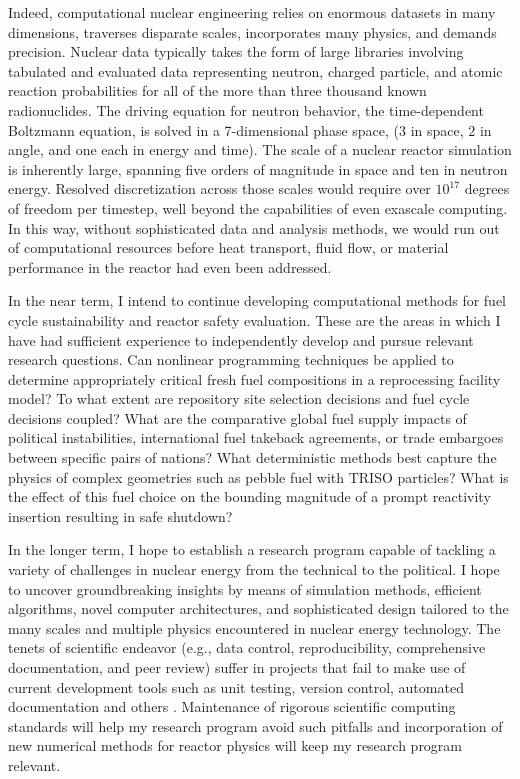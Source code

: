 \documentclass[a4paper, 12pt]{article}
\begin{document}
Indeed, computational nuclear engineering relies on enormous datasets in many 
dimensions, traverses disparate scales, incorporates many physics, and demands 
precision.  Nuclear data typically takes the form of large libraries involving 
tabulated and evaluated data representing neutron, charged particle, and atomic 
reaction probabilities for all of the more than three thousand known 
radionuclides.  The driving equation for neutron behavior, the time-dependent 
Boltzmann equation, is solved in a 7-dimensional phase space, ($3$ in space, $2$ 
in angle, and one each in energy and time). The scale of a nuclear reactor 
simulation is inherently large, spanning five orders of magnitude in space and 
ten in neutron energy. Resolved discretization across those scales would require 
over $10^{17}$ degrees of freedom per timestep, well beyond the
capabilities of even exascale computing. In this way, without sophisticated
data and analysis methods, we would run out of computational resources before
heat transport, fluid flow, or material performance in the reactor had even
been addressed.

In the near term, I intend to continue developing computational methods for fuel 
cycle sustainability and reactor safety evaluation. These are the areas in which I 
have had sufficient experience to independently develop and pursue relevant 
research questions.  Can nonlinear programming techniques be applied to 
determine appropriately critical fresh fuel compositions in a reprocessing 
facility model? To what extent are repository site selection decisions and fuel 
cycle decisions coupled? What are the comparative global fuel supply impacts of 
political instabilities, international fuel takeback agreements, or
trade embargoes between specific pairs of nations?  What deterministic methods 
best capture the physics of complex geometries such as pebble fuel with TRISO 
particles? What is the effect of this fuel choice on the bounding magnitude of a 
prompt reactivity insertion resulting in safe shutdown? 

In the longer term, I hope to establish a research program capable of tackling a 
variety of challenges in nuclear energy from the technical to the political.  I 
hope to uncover groundbreaking insights by means of simulation methods, 
efficient algorithms, novel computer architectures, and sophisticated design 
tailored to the many scales and multiple physics encountered in nuclear energy 
technology.  The tenets of scientific endeavor (e.g., data control, 
reproducibility, comprehensive documentation, and peer review) suffer in 
projects that fail to make use of current development tools such as unit 
testing, version control, automated documentation and others 
\cite{wilson_best_2014, merali_computational_2010}. Maintenance of rigorous 
scientific computing standards will help my research program avoid such pitfalls 
\cite{huff_rapid_2011} and incorporation of new numerical methods for reactor 
physics will keep my research program relevant.
\end{document}
